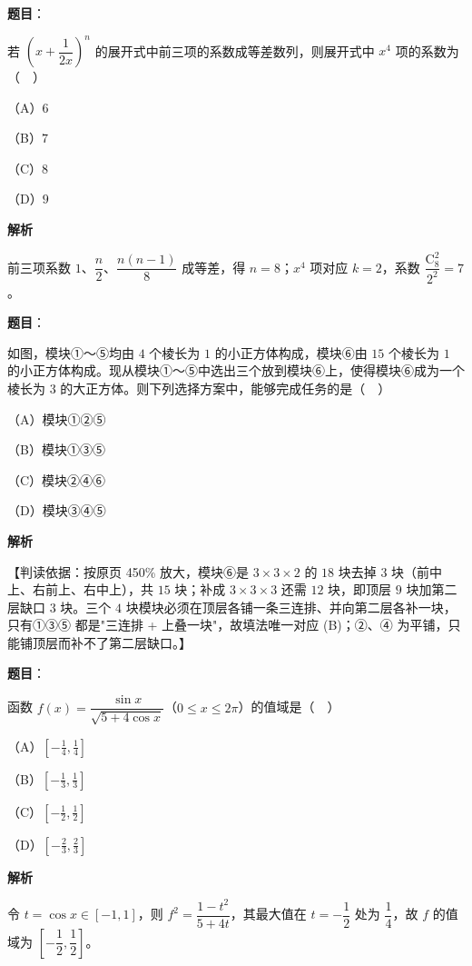 \begin{answer}

\textbf{题目}：

若 $\left(x+\dfrac1{2x}\right)^n$ 的展开式中前三项的系数成等差数列，则展开式中 $x^4$ 项的系数为（　）

（A）$6$

（B）$7$

（C）$8$

（D）$9$

\textbf{解析}

前三项系数 $1$、$\dfrac n2$、$\dfrac{n(n-1)}8$ 成等差，得 $n=8$；$x^4$ 项对应 $k=2$，系数 $\dfrac{\mathrm C_8^2}{2^2}=7$。


\end{answer}
\begin{answer}

\textbf{题目}：

如图，模块①～⑤均由 $4$ 个棱长为 $1$ 的小正方体构成，模块⑥由 $15$ 个棱长为 $1$ 的小正方体构成。现从模块①～⑤中选出三个放到模块⑥上，使得模块⑥成为一个棱长为 $3$ 的大正方体。则下列选择方案中，能够完成任务的是（　）
\nopagebreak[4]
\begin{center}\end{center}
\nopagebreak[4]
（A）模块①②⑤

（B）模块①③⑤

（C）模块②④⑥

（D）模块③④⑤

\textbf{解析}

【判读依据：按原页 450\% 放大，模块⑥是 $3\times3\times2$ 的 $18$ 块去掉 $3$ 块（前中上、右前上、右中上），共 $15$ 块；补成 $3\times3\times3$ 还需 $12$ 块，即顶层 $9$ 块加第二层缺口 $3$ 块。三个 $4$ 块模块必须在顶层各铺一条三连排、并向第二层各补一块，只有①③⑤ 都是"三连排 + 上叠一块"，故填法唯一对应 (B)；②、④ 为平铺，只能铺顶层而补不了第二层缺口。】


\end{answer}
\begin{answer}

\textbf{题目}：

函数 $f(x)=\dfrac{\sin x}{\sqrt{5+4\cos x}}$（$0\leqslant x\leqslant2\pi$）的值域是（　）

（A）$\left[-\frac14,\frac14\right]$

（B）$\left[-\frac13,\frac13\right]$

（C）$\left[-\frac12,\frac12\right]$

（D）$\left[-\frac23,\frac23\right]$

\textbf{解析}

令 $t=\cos x\in[-1,1]$，则 $f^2=\dfrac{1-t^2}{5+4t}$，其最大值在 $t=-\dfrac12$ 处为 $\dfrac14$，故 $f$ 的值域为 $\left[-\dfrac12,\dfrac12\right]$。


\end{answer}

